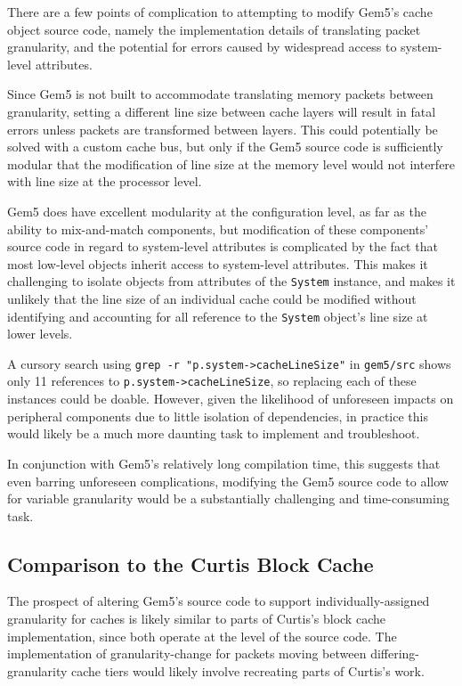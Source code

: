 \documentclass[12pt,twoside]{reedthesis}
\begin{document}
	There are a few points of complication to attempting to modify Gem5's cache object source code, namely the implementation details of translating packet granularity, and the potential for errors caused by widespread access to system-level attributes.
	
	Since Gem5 is not built to accommodate translating memory packets between granularity, setting a different line size between cache layers will result in fatal errors unless packets are transformed between layers. This could potentially be solved with a custom cache bus, but only if the Gem5 source code is sufficiently modular that the modification of line size at the memory level would not interfere with line size at the processor level.
	
	Gem5 does have excellent modularity at the configuration level, as far as the ability to mix-and-match components, but modification of these components' source code in regard to system-level attributes is complicated by the fact that most low-level objects inherit access to system-level attributes. This makes it challenging to isolate objects from attributes of the \verb`System` instance, and makes it unlikely that the line size of an individual cache could be modified without identifying and accounting for all reference to the \verb`System` object's line size at lower levels.

	A cursory search using \verb`grep -r "p.system->cacheLineSize"` in \verb`gem5/src` shows only 11 references to \verb`p.system->cacheLineSize`, so replacing each of these instances could be doable. However, given the likelihood of unforeseen impacts on peripheral components due to little isolation of dependencies, in practice this would likely be a much more daunting task to implement and troubleshoot.
	
	In conjunction with Gem5's relatively long compilation time, this suggests that even barring unforeseen complications, modifying the Gem5 source code to allow for variable granularity would be a substantially challenging and time-consuming task.

	\subsection*{Comparison to the Curtis Block Cache}

	The prospect of altering Gem5's source code to support individually-assigned granularity for caches is likely similar to parts of Curtis's block cache implementation, since both operate at the level of the source code. The implementation of granularity-change for packets moving between differing-granularity cache tiers would likely involve recreating parts of Curtis's work.
	
\end{document}
